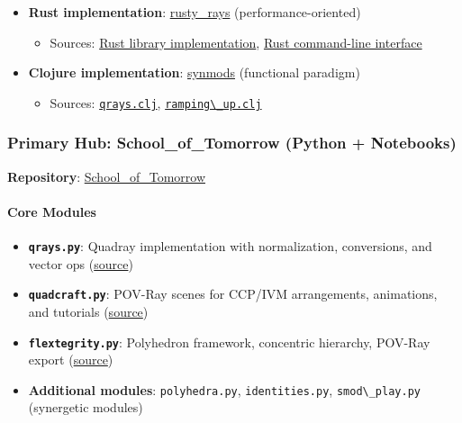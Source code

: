 \documentclass[
  10pt,
]{article}
\newcommand{\passthrough}[1]{#1}
\providecommand{\tightlist}{%
  \setlength{\itemsep}{0pt}\setlength{\parskip}{0pt}}
\begin{document}
\begin{itemize}
\tightlist
\item
  \textbf{Rust implementation}:
  \href{https://github.com/4dsolutions/rusty_rays}{rusty\_rays}
  (performance-oriented)

  \begin{itemize}
  \tightlist
  \item
    Sources:
    \href{https://github.com/4dsolutions/rusty_rays/blob/master/src/lib.rs}{Rust
    library implementation},
    \href{https://github.com/4dsolutions/rusty_rays/blob/master/src/main.rs}{Rust
    command-line interface}
  \end{itemize}
\item
  \textbf{Clojure implementation}:
  \href{https://github.com/4dsolutions/synmods}{synmods} (functional
  paradigm)

  \begin{itemize}
  \tightlist
  \item
    Sources:
    \href{https://github.com/4dsolutions/synmods/blob/master/qrays.clj}{\passthrough{\lstinline!qrays.clj!}},
    \href{https://github.com/4dsolutions/synmods/blob/master/ramping_up.clj}{\passthrough{\lstinline!ramping\_up.clj!}}
  \end{itemize}
\end{itemize}

\hypertarget{primary-hub-school_of_tomorrow-python-notebooks}{%
\subsubsection{Primary Hub: School\_of\_Tomorrow (Python +
Notebooks)}\label{primary-hub-school_of_tomorrow-python-notebooks}}

\textbf{Repository}:
\href{https://github.com/4dsolutions/School_of_Tomorrow}{School\_of\_Tomorrow}

\hypertarget{core-modules}{%
\paragraph{Core Modules}\label{core-modules}}

\begin{itemize}
\tightlist
\item
  \textbf{\passthrough{\lstinline!qrays.py!}}: Quadray implementation
  with normalization, conversions, and vector ops
  (\href{https://github.com/4dsolutions/School_of_Tomorrow/blob/master/qrays.py}{source})
\item
  \textbf{\passthrough{\lstinline!quadcraft.py!}}: POV-Ray scenes for
  CCP/IVM arrangements, animations, and tutorials
  (\href{https://github.com/4dsolutions/School_of_Tomorrow/blob/master/quadcraft.py}{source})
\item
  \textbf{\passthrough{\lstinline!flextegrity.py!}}: Polyhedron
  framework, concentric hierarchy, POV-Ray export
  (\href{https://github.com/4dsolutions/School_of_Tomorrow/blob/master/flextegrity.py}{source})
\item
  \textbf{Additional modules}: \passthrough{\lstinline!polyhedra.py!},
  \passthrough{\lstinline!identities.py!},
  \passthrough{\lstinline!smod\_play.py!} (synergetic modules)
\end{itemize}
\end{document}
